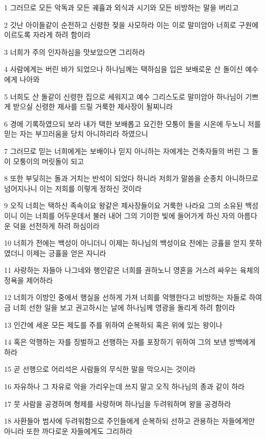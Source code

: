 \par 1 그러므로 모든 악독과 모든 궤휼과 외식과 시기와 모든 비방하는 말을 버리고
\par 2 갓난 아이들같이 순전하고 신령한 젖을 사모하라 이는 이로 말미암아 너희로 구원에 이르도록 자라게 하려 함이라
\par 3 너희가 주의 인자하심을 맛보았으면 그리하라
\par 4 사람에게는 버린 바가 되었으나 하나님께는 택하심을 입은 보배로운 산 돌이신 예수에게 나아와
\par 5 너희도 산 돌같이 신령한 집으로 세워지고 예수 그리스도로 말미암아 하나님이 기쁘게 받으실 신령한 제사를 드릴 거룩한 제사장이 될찌니라
\par 6 경에 기록하였으되 보라 내가 택한 보배롭고 요긴한 모퉁이 돌을 시온에 두노니 저를 믿는 자는 부끄러움을 당치 아니하리라 하였으니
\par 7 그러므로 믿는 너희에게는 보배이나 믿지 아니하는 자에게는 건축자들의 버린 그 돌이 모퉁이의 머릿돌이 되고
\par 8 또한 부딪히는 돌과 거치는 반석이 되었다 하니라 저희가 말씀을 순종치 아니하므로 넘어지나니 이는 저희를 이렇게 정하신 것이라
\par 9 오직 너희는 택하신 족속이요 왕같은 제사장들이요 거룩한 나라요 그의 소유된 백성이니 이는 너희를 어두운데서 불러 내어 그의 기이한 빛에 들어가게 하신 자의 아름다운 덕을 선전하게 하려 하심이라
\par 10 너희가 전에는 백성이 아니더니 이제는 하나님의 백성이요 전에는 긍휼을 얻지 못하였더니 이제는 긍휼을 얻은 자니라
\par 11 사랑하는 자들아 나그네와 행인같은 너희를 권하노니 영혼을 거스려 싸우는 육체의 정욕을 제어하라
\par 12 너희가 이방인 중에서 행실을 선하게 가져 너희를 악행한다고 비방하는 자들로 하여금 너희 선한 일을 보고 권고하시는 날에 하나님께 영광을 돌리게 하려 함이라
\par 13 인간에 세운 모든 제도를 주를 위하여 순복하되 혹은 위에 있는 왕이나
\par 14 혹은 악행하는 자를 징벌하고 선행하는 자를 포장하기 위하여 그의 보낸 방백에게 하라
\par 15 곧 선행으로 어리석은 사람들의 무식한 말을 막으시는 것이라
\par 16 자유하나 그 자유로 악을 가리우는데 쓰지 말고 오직 하나님의 종과 같이 하라
\par 17 뭇 사람을 공경하며 형제를 사랑하며 하나님을 두려워하며 왕을 공경하라
\par 18 사환들아 범사에 두려워함으로 주인들에게 순복하되 선하고 관용하는 자들에게만 아니라 또한 까다로운 자들에게도 그리하라
